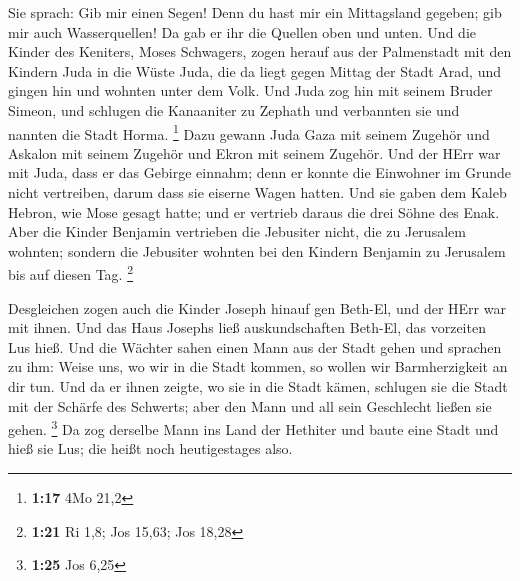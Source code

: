  Sie sprach: Gib mir einen Segen! Denn du hast mir ein
Mittagsland gegeben; gib mir auch Wasserquellen! Da gab er ihr die
Quellen oben und unten.  Und die Kinder des Keniters, Moses
Schwagers, zogen herauf aus der Palmenstadt mit den Kindern Juda in die
Wüste Juda, die da liegt gegen Mittag der Stadt Arad, und gingen hin und
wohnten unter dem Volk.  Und Juda zog hin mit seinem Bruder
Simeon, und schlugen die Kanaaniter zu Zephath und verbannten sie und
nannten die Stadt Horma. \footnote{\textbf{1:17} 4Mo 21,2} 
Dazu gewann Juda Gaza mit seinem Zugehör und Askalon mit seinem Zugehör
und Ekron mit seinem Zugehör.  Und der HErr war mit Juda,
dass er das Gebirge einnahm; denn er konnte die Einwohner im Grunde
nicht vertreiben, darum dass sie eiserne Wagen hatten.  Und
sie gaben dem Kaleb Hebron, wie Mose gesagt hatte; und er vertrieb
daraus die drei Söhne des Enak.  Aber die Kinder Benjamin
vertrieben die Jebusiter nicht, die zu Jerusalem wohnten; sondern die
Jebusiter wohnten bei den Kindern Benjamin zu Jerusalem bis auf diesen
Tag. \footnote{\textbf{1:21} Ri 1,8; Jos 15,63; Jos 18,28}

 Desgleichen zogen auch die Kinder Joseph hinauf gen
Beth-El, und der HErr war mit ihnen.  Und das Haus Josephs
ließ auskundschaften Beth-El, das vorzeiten Lus hieß.  Und
die Wächter sahen einen Mann aus der Stadt gehen und sprachen zu ihm:
Weise uns, wo wir in die Stadt kommen, so wollen wir Barmherzigkeit an
dir tun.  Und da er ihnen zeigte, wo sie in die Stadt
kämen, schlugen sie die Stadt mit der Schärfe des Schwerts; aber den
Mann und all sein Geschlecht ließen sie gehen. \footnote{\textbf{1:25}
  Jos 6,25}  Da zog derselbe Mann ins Land der Hethiter und
baute eine Stadt und hieß sie Lus; die heißt noch heutigestages also.

